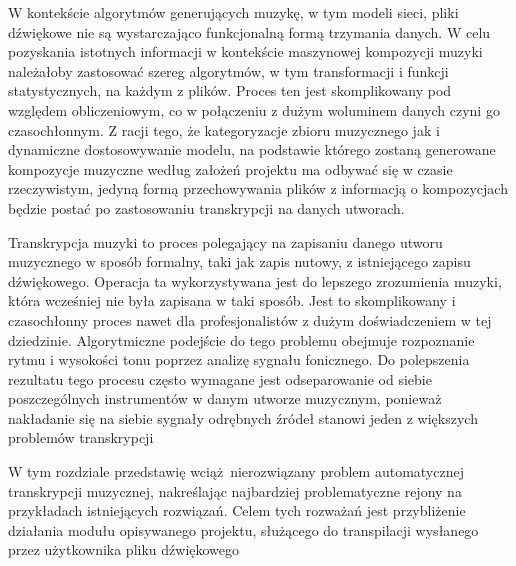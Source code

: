 \documentclass[12pt,a4paper,twoside]{mwart}
\begin{document}
W kontekście algorytmów generujących muzykę, w tym modeli sieci, pliki dźwiękowe nie są wystarczająco funkcjonalną formą trzymania danych. W celu pozyskania istotnych informacji w kontekście maszynowej kompozycji muzyki należałoby zastosować szereg algorytmów, w tym transformacji i funkcji statystycznych, na każdym z plików. Proces ten jest skomplikowany pod względem obliczeniowym, co w połączeniu z dużym woluminem danych czyni go czasochłonnym. Z racji tego, że kategoryzacje zbioru muzycznego jak i dynamiczne dostosowywanie modelu, na podstawie którego zostaną generowane kompozycje muzyczne według założeń projektu ma odbywać się w czasie rzeczywistym, jedyną formą przechowywania plików z informacją o kompozycjach będzie postać po zastosowaniu transkrypcji na danych utworach.


Transkrypcja muzyki to proces polegający na zapisaniu danego utworu muzycznego w sposób formalny, taki jak zapis nutowy, z istniejącego zapisu dźwiękowego. Operacja ta wykorzystywana jest do lepszego zrozumienia muzyki, która wcześniej nie była zapisana w taki sposób. Jest to skomplikowany i czasochłonny proces nawet dla profesjonalistów z dużym doświadczeniem w tej dziedzinie. Algorytmiczne podejście do tego problemu obejmuje rozpoznanie rytmu i wysokości tonu poprzez analizę sygnału fonicznego. Do polepszenia rezultatu tego procesu często wymagane jest odseparowanie od siebie poszczególnych instrumentów w danym utworze muzycznym, ponieważ nakładanie się na siebie sygnały odrębnych źródeł stanowi jeden z większych problemów transkrypcji

W tym rozdziale przedstawię wciąż nierozwiązany problem automatycznej transkrypcji muzycznej, nakreślając najbardziej problematyczne rejony na przykładach istniejących rozwiązań.  Celem tych rozważań jest przybliżenie działania modułu opisywanego projektu, służącego do transpilacji wysłanego przez użytkownika pliku dźwiękowego
\end{document}
